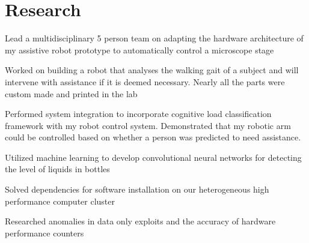 \documentclass[]{deedy-resume-openfont}
\begin{document}
\begin{minipage}[t]{0.66\textwidth}

\section{Research}
\descript{} 
\begin{tightemize}
\item Lead a multidisciplinary 5 person team on adapting the hardware architecture of my assistive robot prototype to automatically control a microscope stage
\item Worked on building a robot that analyses the walking gait of a subject and will intervene with assistance if it is deemed necessary. Nearly all the parts were custom made and printed in the lab
\item Performed system integration to incorporate cognitive load classification framework with my robot control system. Demonstrated that my robotic arm could be controlled based on whether a person was predicted to need assistance. 
\item Utilized machine learning to develop convolutional neural networks for detecting the level of liquids in bottles
\end{tightemize}
\sectionsep

\descript{} 
\begin{tightemize}
\item Solved dependencies for software installation on our heterogeneous high performance computer cluster
\item Researched anomalies in data only exploits and the accuracy of hardware performance counters
\end{tightemize}
\sectionsep




\end{minipage}
\end{document}

